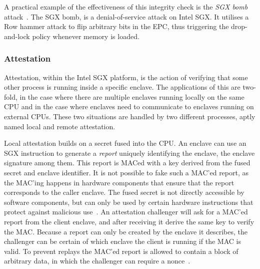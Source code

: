 \documentclass{article}
\begin{document}
			A practical example of the effectiveness of this integrity check is the \textit{SGX bomb} attack~\cite{jang_sgx-bomb_2017}.
			The SGX bomb, is a denial-of-service attack on Intel SGX.
			It utilises a Row hammer attack to flip arbitrary bits in the EPC, thus triggering the drop-and-lock policy whenever memory is loaded.

			\subsubsection{Attestation}
			\label{subsec:attestation}

			Attestation, within the Intel SGX platform, is the action of verifying that some other process is running inside a specific enclave.
			The applications of this are two-fold, in the case where there are multiple enclaves running locally on the same CPU and in the case where enclaves need to communicate to enclaves running on external CPUs.
			These two situations are handled by two different processes, aptly named local and remote attestation.

			Local attestation builds on a secret fused into the CPU.
			An enclave can use an SGX instruction to generate a \textit{report} uniquely identifying the enclave, the enclave signature among them.
			This report is MACed with a key derived from the fused secret and enclave identifier.
			It is not possible to fake such a MAC'ed report, as the MAC'ing happens in hardware components that ensure that the report corresponds to the caller enclave.
			The fused secret is not directly accessible by software components, but can only be used by certain hardware instructions that protect against malicious use~\cite{costan_intel_2016}.
			An attestation challenger will ask for a MAC'ed report from the client enclave, and after receiving it derive the same key to verify the MAC.
			Because a report can only be created by the enclave it describes, the challenger can be certain of which enclave the client is running if the MAC is valid.
			To prevent replays the MAC'ed report is allowed to contain a block of arbitrary data, in which the challenger can require a nonce~\cite{costan_intel_2016}.
\end{document}
